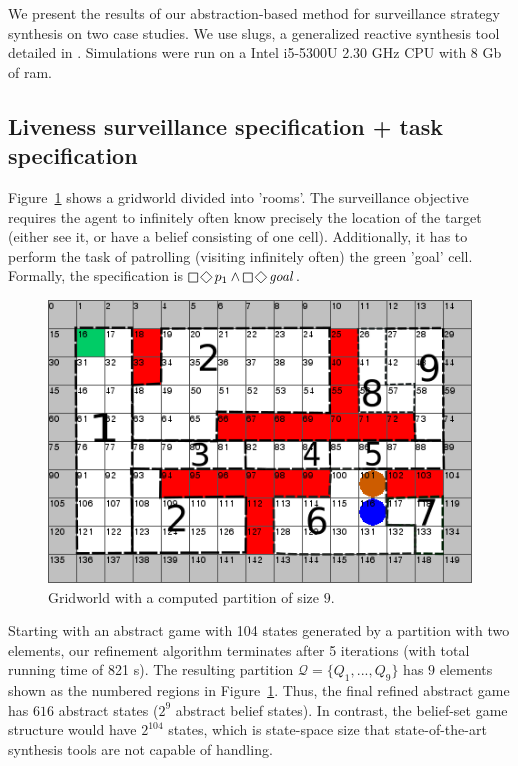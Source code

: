 We present the results of our abstraction-based method for surveillance strategy synthesis on two case studies. We use slugs, a generalized reactive synthesis tool detailed in \cite{EhlersR16}. Simulations were run on a Intel i5-5300U 2.30 GHz CPU with 8 Gb of ram. 

\subsection{Liveness surveillance specification + task specification}
Figure~\ref{fig:case1} shows a gridworld divided into  'rooms'. The surveillance objective requires the agent to infinitely often know precisely the location of the target (either see it, or have a belief consisting of one cell). Additionally, it has to perform the task of patrolling (visiting infinitely often) the green 'goal' cell. Formally, the specification is $\LTLglobally\LTLfinally p_1 \wedge \LTLglobally\LTLfinally \mathit{goal}$. 


\begin{figure}
\centering
\includegraphics[scale=0.3]{text970.png}\caption{Gridworld with a computed partition of size $9$.}\label{fig:case1}
\vspace{-.5cm}
\end{figure}


Starting with an abstract game with 104 states generated by a partition with two elements, our refinement algorithm terminates after 5 iterations (with total running time of 821 s). The resulting partition $\mathcal{Q} = \{Q_1,...,Q_9 \}$ has $9$ elements shown as the numbered regions in Figure~\ref{fig:case1}. Thus, the final refined abstract game has $616$ abstract states ($2^9$ abstract belief states). In contrast, the belief-set game structure would have $2^{104}$ states, which is state-space size that state-of-the-art synthesis tools are not capable of handling.


